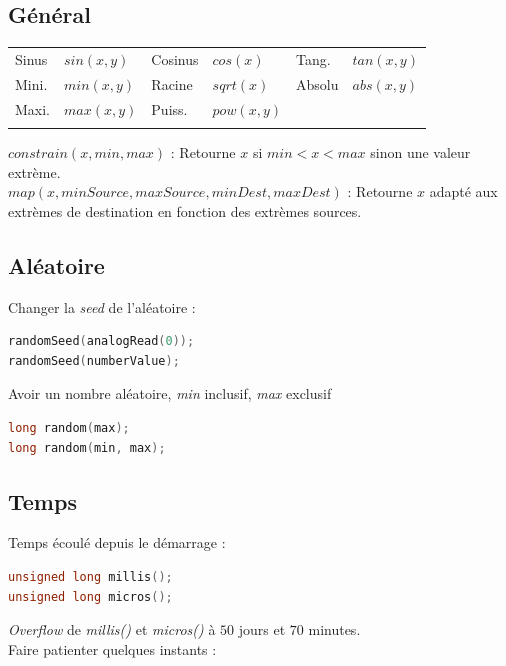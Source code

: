         \subsection{Général}
            \begin{center}
                \begin{tabular}{l l | l l | l l}
                    Sinus & $sin(x,y)$ & Cosinus & $cos(x) $ & Tang. & $tan(x,y)$\\
                    Mini. & $min(x,y)$ & Racine & $sqrt(x) $ & Absolu & $abs(x,y)$\\
                    Maxi. & $max(x,y)$ & Puiss. & $pow(x,y)$ & &\\ \\
                \end{tabular}
            \end{center}

            \bmar
            $constrain(x, min, max)$ : Retourne $x$ si $min < x < max$ sinon une valeur extrème.\\
            $map(x, minSource, maxSource, minDest, maxDest)$ : Retourne $x$ adapté aux extrèmes de destination en fonction des extrèmes sources.
            \emar
        \subsection{Aléatoire}
            \bmar
                Changer la \textit{seed} de l'aléatoire :
            \emar
            \begin{lstlisting}[language=C]
randomSeed(analogRead(0));
randomSeed(numberValue);
            \end{lstlisting}

            \bmar
                Avoir un nombre aléatoire, \textit{min} inclusif, \textit{max} exclusif
            \emar
            \begin{lstlisting}[language=C]
long random(max);
long random(min, max);
            \end{lstlisting}

        \subsection{Temps}
            \bmar
            Temps écoulé depuis le démarrage :
            \emar
            \begin{lstlisting}[language=C]
unsigned long millis();
unsigned long micros();
            \end{lstlisting}
            \bmar
                \textit{Overflow} de \textit{millis()} et \textit{micros()} à $50$ jours et $70$ minutes.\\
                Faire patienter quelques instants :


